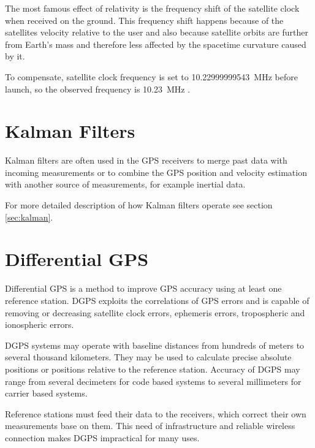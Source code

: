 The most famous effect of relativity is the frequency shift of the satellite clock
when received on the ground.
This frequency shift happens because of the satellites velocity relative to the user
and also because satellite orbits are further from Earth's mass and therefore less
affected by the spacetime curvature caused by it.

To compensate, satellite clock frequency is set to
\SI{10.22999999543}{\mega\hertz} before launch, so the observed frequency
is \SI{10.23}{\mega\hertz} \cite{fyfe92}.

\section{Kalman Filters}
Kalman filters are often used in the GPS receivers to merge past
data with incoming measurements or to combine the GPS position and velocity
estimation with another source of measurements, for example inertial data.

For more detailed description of how Kalman filters operate see section
\ref{sec:kalman}.

\section{Differential GPS}
\label{sec:dgps}

Differential GPS is a method to improve GPS accuracy using at least one reference station.
DGPS exploits the correlations of GPS errors and is capable of removing or decreasing satellite clock errors,
ephemeris errors, tropospheric and ionospheric errors.

DGPS systems may operate with baseline distances from hundreds of meters to several thousand kilometers.
They may be used to calculate precise absolute positions or positions relative to the reference station.
Accuracy of DGPS may range from several decimeters for code based systems to several
millimeters for carrier based systems.

Reference stations must feed their data to the receivers, which correct their own measurements base on them.
This need of infrastructure and reliable wireless connection makes DGPS impractical for many uses.


